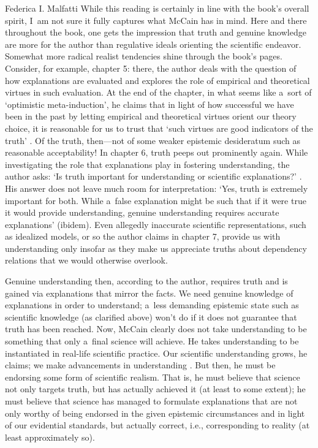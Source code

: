 \begin{recengenv}{Federica I. Malfatti}
\enlargethispage{1.5\baselineskip}
While this reading is certainly in line with the book's overall spirit, I~am not sure it fully captures what McCain has in mind. Here and there throughout the book, one gets the impression that truth and genuine knowledge are more for the author than regulative ideals orienting the scientific endeavor. Somewhat more radical realist tendencies shine through the book's pages. Consider, for example, chapter 5: there, the author deals with the question of how explanations are evaluated and explores the role of empirical and theoretical virtues in such evaluation. At the end of the chapter, in what seems like a~sort of ‘optimistic meta-induction', he claims that in light of how successful we have been in the past by letting empirical and theoretical virtues orient our theory choice, it is reasonable for us to trust that ‘such virtues are good indicators of the truth'
\parencite[][p.68]{mccain_understanding_2022}. %
 Of the truth, then---not of some weaker epistemic desideratum such as reasonable acceptability! In chapter 6, truth peeps out prominently again. While investigating the role that explanations play in fostering understanding, the author asks: ‘Is truth important for understanding or scientific explanations?' 
\parencite[][p.78]{mccain_understanding_2022}. %
 His answer does not leave much room for interpretation: ‘Yes, truth is extremely important for both. While a~false explanation might be such that if it were true it would provide understanding, genuine understanding requires accurate explanations' (ibidem). Even allegedly inaccurate scientific representations, such as idealized models, or so the author claims in chapter 7, provide us with understanding only insofar as they make us appreciate truths about dependency relations that we would otherwise overlook.

Genuine understanding then, according to the author, requires truth and is gained via explanations that mirror the facts. We need genuine knowledge of explanations in order to understand; a~less demanding epistemic state such as scientific knowledge (as clarified above) won't do if it does not guarantee that truth has been reached. Now, McCain clearly does not take understanding to be something that only a~final science will achieve. He takes understanding to be instantiated in real-life scientific practice. Our scientific understanding grows, he claims; we make advancements in understanding
\parencite[see, e.g.][p.68]{mccain_understanding_2022}. %
 But then, he must be endorsing some form of scientific realism. That is, he must believe that science not only targets truth, but has actually achieved it (at least to some extent); he must believe that science has managed to formulate explanations that are not only worthy of being endorsed in the given epistemic circumstances and in light of our evidential standards, but actually correct, i.e., corresponding to reality (at least approximately so).


\end{recengenv}
